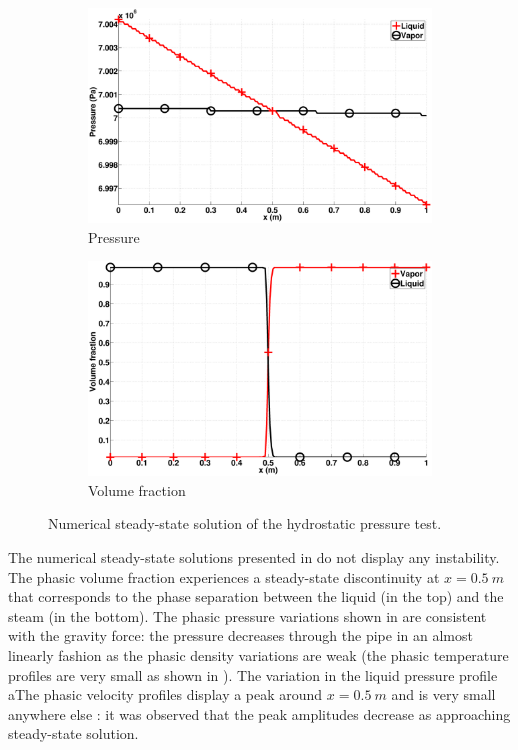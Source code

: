 \documentclass[preprint,10pt]{elsarticle}
\begin{document}
\begin{figure}[H]
        \begin{subfigure}[b]{0.495\textwidth}
                \centering
                \includegraphics[width=\textwidth]{figures/hydrostatic-_two_phases_pressure.eps}
                \caption{Pressure}
                \label{fig:hydrostatic--press}
        \end{subfigure}        
        \begin{subfigure}[b]{0.495\textwidth}
                \centering
                \includegraphics[width=\textwidth]{figures/hydrostatic-_two_phases_volume_fraction.eps}
                \caption{Volume fraction}
                \label{fig:hydrostatic--vf}
        \end{subfigure}
        \caption{Numerical steady-state solution of the hydrostatic pressure test.}\label{fig:hydrostatic--variables}
\end{figure}
%
The numerical steady-state solutions presented in  do not display any instability. The phasic volume fraction experiences a steady-state discontinuity at $x=0.5 \ m$ that corresponds to the phase separation between the liquid (in the top) and the steam (in the bottom). The phasic pressure variations shown in  are consistent with the gravity force: the pressure decreases through the pipe in an almost linearly fashion as the phasic density variations are weak (the phasic temperature profiles are very small as shown in ). The variation in the liquid pressure profile aThe phasic velocity profiles display a peak around $x=0.5 \ m$ and is very small anywhere else : it was observed that the peak amplitudes decrease as approaching steady-state solution.
\end{document}

